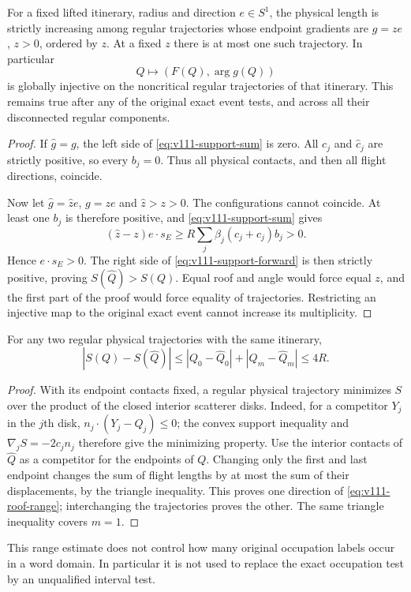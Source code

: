 \begin{theorem}
\label{thm:v111-unique}
For a fixed lifted itinerary, radius and direction $e\in S^1$,
the physical length is strictly increasing among regular trajectories
whose endpoint gradients are $g=ze$, $z>0$, ordered by $z$.
At a fixed $z$ there is at most one such trajectory. In particular
\begin{equation}\label{eq:v111-map}
                    Q\longmapsto(F(Q),\arg g(Q))
\end{equation}
is globally injective on the noncritical regular trajectories of
that itinerary. This remains true after any of the original exact
event tests, and across all their disconnected regular components.
\end{theorem}
\begin{proof}
If $\widehat g=g$, the left side of
\eqref{eq:v111-support-sum} is zero. All $c_j$ and $\widehat c_j$
are strictly positive, so every $b_j=0$. Thus all physical contacts,
and then all flight directions, coincide.

Now let $\widehat g=\widehat z e$, $g=ze$ and $\widehat z>z>0$.
The configurations cannot coincide. At least one $b_j$ is therefore
positive, and \eqref{eq:v111-support-sum} gives
\[
 (\widehat z-z)e\cdot s_E
       \ge R\sum_j\beta_j(c_j+\widehat c_j)b_j>0.
\]
Hence $e\cdot s_E>0$. The right side of
\eqref{eq:v111-support-forward} is then strictly positive, proving
$S(\widehat Q)>S(Q)$. Equal roof and angle would force equal $z$,
and the first part of the proof would force equality of trajectories.
Restricting an injective map to the original exact event cannot
increase its multiplicity.
\end{proof}

\begin{lemma}
\label{lem:v111-roof-range}
For any two regular physical trajectories with the same itinerary,
\begin{equation}\label{eq:v111-roof-range}
 |S(Q)-S(\widehat Q)|
       \le |Q_0-\widehat Q_0|+|Q_m-\widehat Q_m|\le4R.
\end{equation}
\end{lemma}
\begin{proof}
With its endpoint contacts fixed, a regular physical trajectory
minimizes $S$ over the product of the closed interior scatterer
disks. Indeed, for a competitor $Y_j$ in the $j$th disk,
$n_j\cdot(Y_j-Q_j)\le0$; the convex support inequality and
$\nabla_jS=-2c_jn_j$ therefore give the minimizing property.
Use the interior contacts of $\widehat Q$ as a competitor for the
endpoints of $Q$. Changing only the first and last endpoint changes
the sum of flight lengths by at most the sum of their displacements,
by the triangle inequality. This proves one direction of
\eqref{eq:v111-roof-range}; interchanging the trajectories proves
the other. The same triangle inequality covers $m=1$.
\end{proof}
This range estimate does not control how many original occupation
labels occur in a word domain. In particular it is not used to
replace the exact occupation test by an unqualified interval test.

